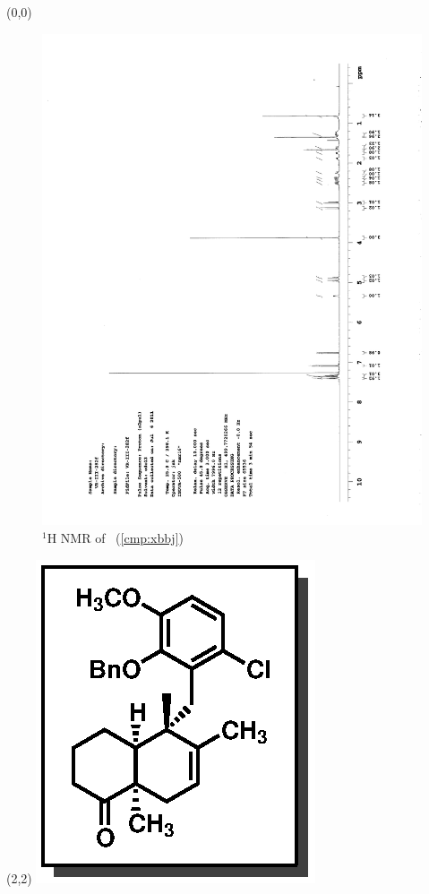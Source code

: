 \begin{textblock}{20}(0,0)
\begin{figure}[htb]
\caption{$^1$H NMR of \CMPxbbj\ (\ref{cmp:xbbj})}
\includegraphics[scale=0.75, trim = 0mm 0mm 0mm 5mm,
clip]{chp_singlecarbon/images/nmr/xbbjH}
\vspace{-100pt}
\end{figure}
\end{textblock}
\begin{textblock}{1}(2,2)
\includegraphics[scale=0.8, angle=90]{chp_singlecarbon/images/xbbj}
\end{textblock}
